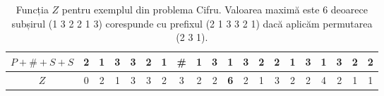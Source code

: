 \documentclass[../main.tex]{subfiles}
\begin{document}
\begin{table}[ht]
  \centering
  \begin{tabular}{c|ccccccccccccccccccc}
    \hline
    $P + \# + S + S$ & 2 & 1 & 3 & 3 & 2 & 1 & \# & 1 & 3 & 1 & 3 & 2 & 2 & 1 & 3 & 1 & 3 & 2 & 2 \\
    \hline
    $Z$ & 0 & 2 & 1 & 3 & 3 & 2 & 3 & 2 & 2 & \textbf{6} & 2 & 1 & 3 & 2 & 2 & 4 & 2 & 1 & 1 \\
    \hline
  \end{tabular}

  \caption{Funcția $Z$ pentru exemplul din problema Cifru. Valoarea maximă este 6 deoarece subșirul (1 3 2 2 1 3) corespunde cu prefixul (2 1 3 3 2 1) dacă aplicăm permutarea (2 3 1).}
\end{table}
\end{document}
